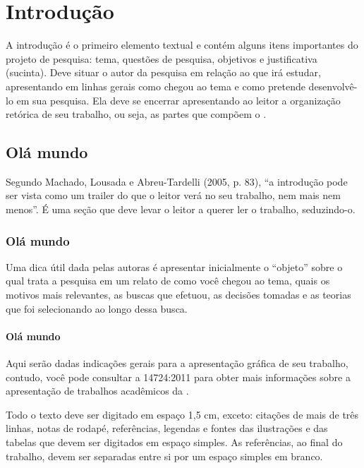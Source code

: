 

\chapter{Introdução}

A introdução é o primeiro elemento textual e contém alguns itens importantes do projeto de pesquisa: tema, questões de pesquisa, objetivos e justificativa (sucinta). Deve situar o autor da pesquisa em relação ao que irá estudar, apresentando em linhas gerais como chegou ao tema e como pretende desenvolvê-lo em sua pesquisa. Ela deve se encerrar apresentando ao leitor a organização retórica de seu trabalho, ou seja, as partes que compõem o .

\section{Olá mundo}

Segundo Machado, Lousada e Abreu-Tardelli (2005, p. 83), “a introdução pode ser vista como um trailer do que o leitor verá no seu trabalho, nem mais nem menos”. É uma seção que deve levar o leitor a querer ler o trabalho, seduzindo-o.

\subsection{Olá mundo}

Uma dica útil dada pelas autoras é apresentar inicialmente o “objeto” sobre o qual trata a pesquisa em um relato de como você chegou ao tema, quais os motivos mais relevantes, as buscas que efetuou, as decisões tomadas e as teorias que foi selecionando ao longo dessa busca. 

\subsubsection{Olá mundo}

Aqui serão dadas indicações gerais para a apresentação gráfica de seu trabalho, contudo, você pode consultar a  14724:2011 para obter mais informações sobre a apresentação de trabalhos acadêmicos da .


Todo o texto deve ser digitado em espaço 1,5 cm, exceto: citações de mais de três linhas, notas de rodapé, referências, legendas e fontes das ilustrações e das tabelas que devem ser digitados em espaço simples. As referências, ao final do trabalho, devem ser separadas entre si por um espaço simples em branco.


